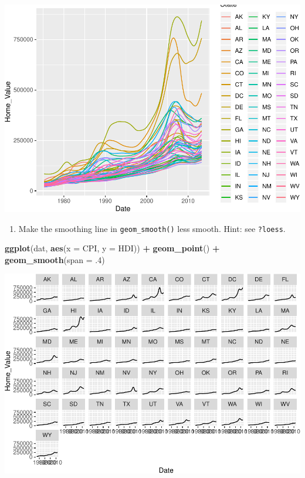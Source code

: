 \documentclass[
]{book}
\newenvironment{Shaded}{\begin{snugshade}}{\end{snugshade}}
\newcommand{\DataTypeTok}[1]{\textcolor[rgb]{0.13,0.29,0.53}{#1}}
\newcommand{\FloatTok}[1]{\textcolor[rgb]{0.00,0.00,0.81}{#1}}
\newcommand{\KeywordTok}[1]{\textcolor[rgb]{0.13,0.29,0.53}{\textbf{#1}}}
\newcommand{\NormalTok}[1]{#1}
\newcommand{\OperatorTok}[1]{\textcolor[rgb]{0.81,0.36,0.00}{\textbf{#1}}}
\newcommand{\StringTok}[1]{\textcolor[rgb]{0.31,0.60,0.02}{#1}}
\providecommand{\tightlist}{%
  \setlength{\itemsep}{0pt}\setlength{\parskip}{0pt}}
\begin{document}
\begin{alert}
\includegraphics{R/Rgraphics/figures/unnamed-chunk-177-1.pdf}

\begin{enumerate}
\def\labelenumi{\arabic{enumi}.}
\setcounter{enumi}{2}
\tightlist
\item
  Make the smoothing line in \texttt{geom\_smooth()} less smooth. Hint: see \texttt{?loess}.
\end{enumerate}

\begin{Shaded}
\begin{Highlighting}[]
\KeywordTok{ggplot}\NormalTok{(dat, }\KeywordTok{aes}\NormalTok{(}\DataTypeTok{x =}\NormalTok{ CPI, }\DataTypeTok{y =}\NormalTok{ HDI)) }\OperatorTok{+}
\StringTok{  }\KeywordTok{geom\_point}\NormalTok{() }\OperatorTok{+}
\StringTok{  }\KeywordTok{geom\_smooth}\NormalTok{(}\DataTypeTok{span =} \FloatTok{.4}\NormalTok{)}
\end{Highlighting}
\end{Shaded}

\includegraphics{R/Rgraphics/figures/unnamed-chunk-178-1.pdf}


\end{alert}
\end{document}
